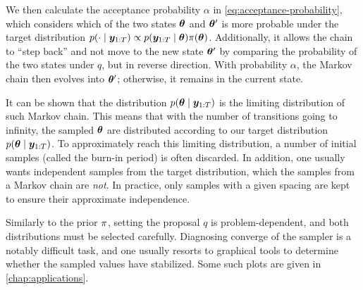 We then calculate the acceptance probability $\alpha$ in \eqref{eq:acceptance-probability}, which considers which of the two states $\bm{\theta}$ and $\bm{\theta}^\prime$ is more probable under the target distribution ${p(\cdot \mid \bm{y}_{1:T}) \propto p(\bm{y}_{1:T} \mid \bm{\theta}) \pi(\bm{\theta})}$. Additionally, it allows the chain to ``step back'' and not move to the new state $\bm{\theta}^\prime$ by comparing the probability of the two states under $q$, but in reverse direction. With probability $\alpha$, the Markov chain then evolves into $\bm{\theta}^\prime$; otherwise, it remains in the current state.

It can be shown \citep{robert-casella} that the distribution $p(\bm{\theta} \mid \bm{y}_{1:T})$ is the limiting distribution of such Markov chain. This means that with the number of transitions going to infinity, the sampled $\bm{\theta}$ are distributed according to our target distribution $p(\bm{\theta} \mid \bm{y}_{1:T})$. To approximately reach this limiting distribution, a number of initial samples (called the burn-in period) is often discarded. In addition, one usually wants independent samples from the target distribution, which the samples from a Markov chain are \emph{not}. In practice, only samples with a given spacing are kept to ensure their approximate independence.

Similarly to the prior $\pi$, setting the proposal $q$ is problem-dependent, and both distributions must be selected carefully. Diagnosing converge of the sampler is a notably difficult task, and one usually resorts to graphical tools to determine whether the sampled values have stabilized. Some such plots are given in \autoref{chap:applications}.

